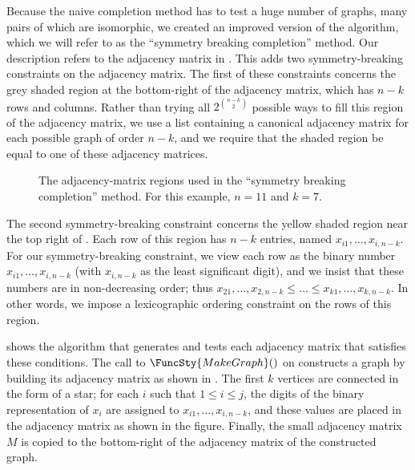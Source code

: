 Because the naive completion method has to test a huge number of graphs,
many pairs of which are isomorphic, we created an improved version of the
algorithm, which we will refer to as the ``symmetry breaking completion''
method.  Our description refers to the adjacency matrix in
.
This adds two symmetry-breaking constraints on the adjacency matrix.
The first of these constraints concerns the grey shaded region at the bottom-right
of the adjacency matrix, which has $n - k$ rows and columns.  Rather than
trying all $2^{n-k \choose 2}$ possible ways to fill this region of the
adjacency matrix, we use a list containing a canonical adjacency matrix
for each possible graph of order $n-k$, and we require that the shaded
region be equal to one of these adjacency matrices.

\begin{figure}[h!]
    \centering
    \footnotesize
    \caption{The adjacency-matrix regions used in the 
        ``symmetry breaking completion'' method. For this example, $n=11$ and $k=7$.}
\label{fig:regions-for-trees}
\end{figure}

The second symmetry-breaking constraint concerns the yellow shaded region
near the top right of
. Each row of this region has $n-k$ entries,
named $x_{i1}, \dots, x_{i,n-k}$.  For our symmetry-breaking constraint, we
view each row as the binary number $x_{i1}, \dots, x_{i,n-k}$
(with $x_{i,n-k}$ as the least significant digit), and we insist
that these numbers are in non-decreasing order; thus
$x_{21}, \dots, x_{2,n-k} \leq \dots \leq x_{k1}, \dots, x_{k,n-k}$.
In other words, we impose a lexicographic ordering constraint
on the rows of this region.

 shows the algorithm that generates and tests each
adjacency matrix that satisfies these conditions.
The call to $\FuncSty{MakeGraph}()$ on
 constructs a graph by building its
adjacency matrix as shown in .  The
first $k$ vertices are connected in the form of a star;
for each $i$ such that $1 \leq i \leq j$, the digits of the binary
representation of $x_i$
are assigned to $x_{i1}, \dots, x_{i,n-k}$, and these values
are placed in the adjacency matrix as shown in the figure.  Finally,
the small adjacency matrix $M$ is copied to the bottom-right of
the adjacency matrix of the constructed graph.

